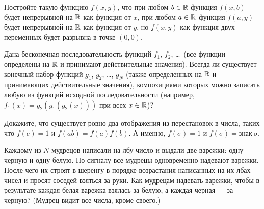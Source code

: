\documentclass[a4paper,12pt]{article}
\begin{document}
Постройте такую функцию $f(x,y)$, что при любом $b\in\mathbb{R}$ функция $f(x,b)$
будет непрерывной на $\mathbb{R}$ как функция от $x$, при любом $a\in\mathbb{R}$
функция $f(a,y)$ будет непрерывной на $\mathbb{R}$ как функция от $y$,
но $f(x,y)$ как функция двух переменных будет разрывна в точке $(0,0)$.


Дана бесконечная последовательность функций
$f_1$, $f_2$, \ldots \ (все функции определены на $\mathbb{R}$ и принимают
действительные значения).
Всегда ли существует конечный набор
функций $g_1$, $g_2$, \ldots, $g_N$ (также определенных на $\mathbb{R}$ и принимающих
действительные значения),
композициями которых можно записать любую из функций исходной
последовательности (например, $f_1(x)=g_2(g_1(g_2(x)))$ при всех $x\in\mathbb{R}$)?


Докажите, что существует ровно два отображения из перестановок в числа, таких что
$f(e)=1$ и $f(ab)=f(a)f(b)$. А именно, $f(\sigma) =1$ и $f(\sigma) = \text{знак}\ \sigma$.

Каждому из $N$ мудрецов написали на лбу число и выдали две варежки:
одну черную и одну белую. По сигналу все мудрецы одновременно надевают варежки.
После чего их строят в шеренгу в порядке возрастания написанных на их лбах чисел
и просят соседей взяться за руки.
Как мудрецам надевать варежки, чтобы в результате каждая белая варежка взялась
за белую, а каждая черная — за черную? (Мудрец видит все числа, кроме своего.)

\end{document}
